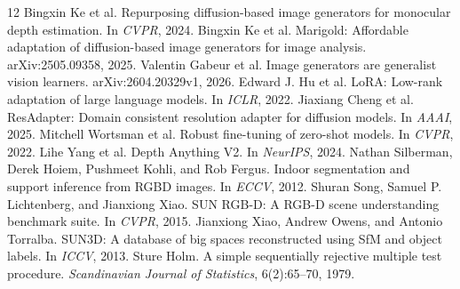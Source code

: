\documentclass[10pt,twocolumn,letterpaper]{article}
\begin{document}
{\small\begin{thebibliography}{12}
 Bingxin Ke et al. Repurposing diffusion-based image generators for monocular depth estimation. In \emph{CVPR}, 2024.
 Bingxin Ke et al. Marigold: Affordable adaptation of diffusion-based image generators for image analysis. arXiv:2505.09358, 2025.
 Valentin Gabeur et al. Image generators are generalist vision learners. arXiv:2604.20329v1, 2026.
 Edward J. Hu et al. LoRA: Low-rank adaptation of large language models. In \emph{ICLR}, 2022.
 Jiaxiang Cheng et al. ResAdapter: Domain consistent resolution adapter for diffusion models. In \emph{AAAI}, 2025.
 Mitchell Wortsman et al. Robust fine-tuning of zero-shot models. In \emph{CVPR}, 2022.
 Lihe Yang et al. Depth Anything V2. In \emph{NeurIPS}, 2024.
 Nathan Silberman, Derek Hoiem, Pushmeet Kohli, and Rob Fergus. Indoor segmentation and support inference from RGBD images. In \emph{ECCV}, 2012.
 Shuran Song, Samuel P. Lichtenberg, and Jianxiong Xiao. SUN RGB-D: A RGB-D scene understanding benchmark suite. In \emph{CVPR}, 2015.
 Jianxiong Xiao, Andrew Owens, and Antonio Torralba. SUN3D: A database of big spaces reconstructed using SfM and object labels. In \emph{ICCV}, 2013.
 Sture Holm. A simple sequentially rejective multiple test procedure. \emph{Scandinavian Journal of Statistics}, 6(2):65--70, 1979.
\end{thebibliography}}
\end{document}
